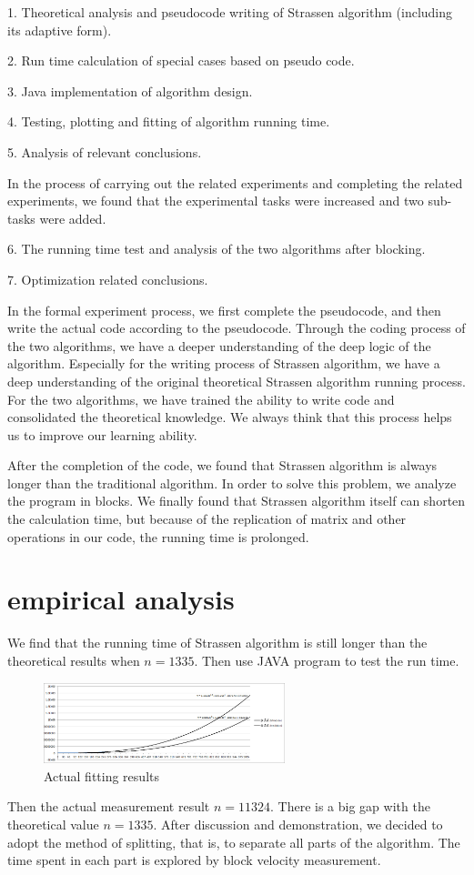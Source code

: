 \documentclass[journal]{IEEEtran}
\begin{document}
1. Theoretical analysis and pseudocode writing of Strassen algorithm (including its adaptive form).


2. Run time calculation of special cases based on pseudo code.


3. Java implementation of algorithm design.


4. Testing, plotting and fitting of algorithm running time.


5. Analysis of relevant conclusions.


In the process of carrying out the related experiments and completing the related experiments, we found that the experimental tasks were increased and two sub-tasks were added.


6. The running time test and analysis of the two algorithms after blocking.


7. Optimization related conclusions.


In the formal experiment process, we first complete the pseudocode, and then write the actual code according to the pseudocode.
Through the coding process of the two algorithms, we have a deeper understanding of the deep logic of the algorithm.
Especially for the writing process of Strassen algorithm, we have a deep understanding of the original theoretical Strassen algorithm running process.
For the two algorithms, we have trained the ability to write code and consolidated the theoretical knowledge.
We always think that this process helps us to improve our learning ability.


After the completion of the code, we found that Strassen algorithm is always longer than the traditional algorithm. 
In order to solve this problem, we analyze the program in blocks.
We finally found that Strassen algorithm itself can shorten the calculation time, but because of the replication of matrix and other operations in our code, the running time is prolonged.

\section{empirical analysis}
We find that the running time of Strassen algorithm is still longer than the theoretical results when $n = 1335$.
Then use JAVA program to test the run time.
\begin{figure}[h]
	\centering
	\includegraphics[width=70mm]{./img/1.png}
	\caption{Actual fitting results}
	\label{fig_sim}
\end{figure}
Then the actual measurement result $n=11324$.
There is a big gap with the theoretical value $n=1335$.
After discussion and demonstration, we decided to adopt the method of splitting, that is, to separate all parts of the algorithm.
The time spent in each part is explored by block velocity measurement.
\end{document}
